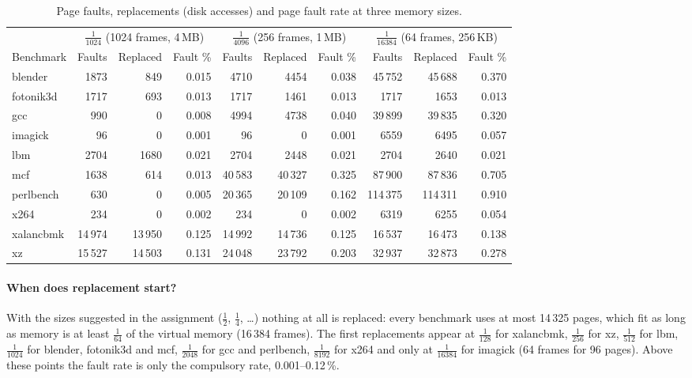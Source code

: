 \documentclass[11pt,a4paper]{article}
\begin{document}
\begin{table}[H]
\centering\small
\setlength{\tabcolsep}{4pt}
\begin{tabular}{@{}l rrr rrr rrr@{}}
\toprule
& \multicolumn{3}{c}{$\frac{1}{1024}$ (1024 frames, 4\,MB)} & \multicolumn{3}{c}{$\frac{1}{4096}$ (256 frames, 1\,MB)} & \multicolumn{3}{c}{$\frac{1}{16384}$ (64 frames, 256\,KB)} \\
\cmidrule(lr){2-4}\cmidrule(lr){5-7}\cmidrule(l){8-10}
Benchmark & Faults & Replaced & Fault \% & Faults & Replaced & Fault \% & Faults & Replaced & Fault \% \\
\midrule
blender   &  1873 &   849 & 0.015 &  4710 &  4454 & 0.038 & 45\,752 & 45\,688 & 0.370 \\
fotonik3d &  1717 &   693 & 0.013 &  1717 &  1461 & 0.013 &   1717 &   1653 & 0.013 \\
gcc       &   990 &     0 & 0.008 &  4994 &  4738 & 0.040 & 39\,899 & 39\,835 & 0.320 \\
imagick   &    96 &     0 & 0.001 &    96 &     0 & 0.001 &   6559 &   6495 & 0.057 \\
lbm       &  2704 &  1680 & 0.021 &  2704 &  2448 & 0.021 &   2704 &   2640 & 0.021 \\
mcf       &  1638 &   614 & 0.013 & 40\,583 & 40\,327 & 0.325 & 87\,900 & 87\,836 & 0.705 \\
perlbench &   630 &     0 & 0.005 & 20\,365 & 20\,109 & 0.162 & 114\,375 & 114\,311 & 0.910 \\
x264      &   234 &     0 & 0.002 &   234 &     0 & 0.002 &   6319 &   6255 & 0.054 \\
xalancbmk & 14\,974 & 13\,950 & 0.125 & 14\,992 & 14\,736 & 0.125 & 16\,537 & 16\,473 & 0.138 \\
xz        & 15\,527 & 14\,503 & 0.131 & 24\,048 & 23\,792 & 0.203 & 32\,937 & 32\,873 & 0.278 \\
\bottomrule
\end{tabular}
\caption{Page faults, replacements (disk accesses) and page fault rate at three memory sizes.}
\label{tab:p4}
\end{table}

\paragraph{When does replacement start?} With the sizes suggested in the assignment
($\frac{1}{2}$, $\frac{1}{4}$, \dots) nothing at all is replaced: every benchmark uses at most
14\,325 pages, which fit as long as memory is at least $\frac{1}{64}$ of the virtual memory
(16\,384 frames). The first replacements appear at $\frac{1}{128}$ for xalancbmk, $\frac{1}{256}$ for
xz, $\frac{1}{512}$ for lbm, $\frac{1}{1024}$ for blender, fotonik3d and mcf, $\frac{1}{2048}$ for gcc
and perlbench, $\frac{1}{8192}$ for x264 and only at $\frac{1}{16384}$ for imagick (64 frames for
96 pages). Above these points the fault rate is only the compulsory rate, 0.001--0.12\,\%.
\end{document}
